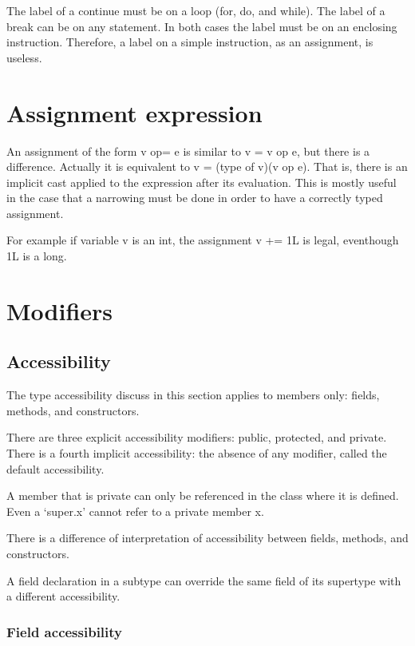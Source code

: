 \documentclass{book}
\begin{document}
The label of a continue must be on a loop (for, do, and while). The
label of a break can be on any statement. In both cases the label must
be on an enclosing instruction. Therefore, a label on a simple
instruction, as an assignment, is useless.

\section{Assignment expression}

An assignment of the form v op= e is similar to v = v op e, but there
is a difference. Actually it is equivalent to v = (type of v)(v op e).
That is, there is an implicit cast applied to the expression after its
evaluation. This is mostly useful in the case that a narrowing must be
done in order to have a correctly typed assignment.

For example if variable v is an int, the assignment v += 1L is legal,
eventhough 1L is a long.

\section{Modifiers}


\subsection{Accessibility}

The type accessibility discuss in this section applies to members
only: fields, methods, and constructors.

There are three explicit accessibility modifiers: public, protected,
and private. There is a fourth implicit accessibility: the absence of
any modifier, called the default accessibility.

A member that is private can only be referenced in the class where it
is defined. Even a `super.x' cannot refer to a private member x.

There is a difference of interpretation of accessibility between
fields, methods, and constructors.

A field declaration in a subtype can override the same field of its
supertype with a different accessibility.

\subsubsection{Field accessibility}
\end{document}
